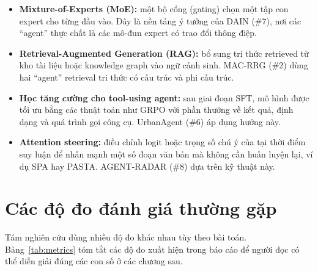 \begin{itemize}
  \item \textbf{Mixture-of-Experts (MoE):} một bộ cổng (gating) chọn một tập con expert cho từng đầu vào. Đây là nền tảng ý tưởng của DAIN (\#7), nơi các ``agent'' thực chất là các mô-đun expert có trao đổi thông điệp.
  \item \textbf{Retrieval-Augmented Generation (RAG):} bổ sung tri thức retrieved từ kho tài liệu hoặc knowledge graph vào ngữ cảnh sinh. MAC-RRG (\#2) dùng hai ``agent'' retrieval tri thức có cấu trúc và phi cấu trúc.
  \item \textbf{Học tăng cường cho tool-using agent:} sau giai đoạn SFT, mô hình được tối ưu bằng các thuật toán như GRPO với phần thưởng về kết quả, định dạng và quá trình gọi công cụ. UrbanAgent (\#6) áp dụng hướng này.
  \item \textbf{Attention steering:} điều chỉnh logit hoặc trọng số chú ý của \LLM{} tại thời điểm suy luận để nhấn mạnh một số đoạn văn bản mà không cần huấn luyện lại, ví dụ SPA hay PASTA. AGENT-RADAR (\#8) dựa trên kỹ thuật này.
\end{itemize}

\section{Các độ đo đánh giá thường gặp}
\label{sec:metrics}

Tám nghiên cứu dùng nhiều độ đo khác nhau tùy theo bài toán. Bảng~\ref{tab:metrics} tóm tắt các độ đo xuất hiện trong báo cáo để người đọc có thể diễn giải đúng các con số ở các chương sau.

